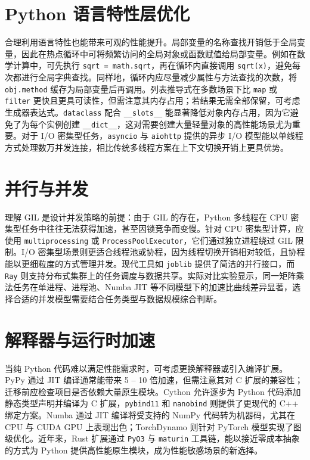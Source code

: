 \chapter{Python 语言特性层优化}
合理利用语言特性也能带来可观的性能提升。局部变量的名称查找开销低于全局变量，因此在热点循环中可将频繁访问的全局对象或函数赋值给局部变量。例如在数学计算中，可先执行 \texttt{sqrt = math.sqrt}，再在循环内直接调用 \texttt{sqrt(x)}，避免每次都进行全局字典查找。同样地，循环内应尽量减少属性与方法查找的次数，将 \texttt{obj.method} 缓存为局部变量后再调用。列表推导式在多数场景下比 \texttt{map} 或 \texttt{filter} 更快且更具可读性，但需注意其内存占用；若结果无需全部保留，可考虑生成器表达式。\texttt{dataclass} 配合 \texttt{\_{}\_{}slots\_{}\_{}} 能显著降低对象内存占用，因为它避免了为每个实例创建 \texttt{\_{}\_{}dict\_{}\_{}}，这对需要创建大量轻量对象的高性能场景尤为重要。对于 I/O 密集型任务，\texttt{asyncio} 与 \texttt{aiohttp} 提供的异步 I/O 模型能以单线程方式处理数万并发连接，相比传统多线程方案在上下文切换开销上更具优势。\par
\chapter{并行与并发}
理解 GIL 是设计并发策略的前提：由于 GIL 的存在，Python 多线程在 CPU 密集型任务中往往无法获得加速，甚至因锁竞争而变慢。针对 CPU 密集型计算，应使用 \texttt{multiprocessing} 或 \texttt{ProcessPoolExecutor}，它们通过独立进程绕过 GIL 限制。I/O 密集型场景则更适合线程池或协程，因为线程切换开销相对较低，且协程能以更细粒度的方式管理并发。现代工具如 \texttt{joblib} 提供了简洁的并行接口，而 \texttt{Ray} 则支持分布式集群上的任务调度与数据共享。实际对比实验显示，同一矩阵乘法任务在单进程、进程池、Numba JIT 等不同模型下的加速比曲线差异显著，选择合适的并发模型需要结合任务类型与数据规模综合判断。\par
\chapter{解释器与运行时加速}
当纯 Python 代码难以满足性能需求时，可考虑更换解释器或引入编译扩展。PyPy 通过 JIT 编译通常能带来 5 – 10 倍加速，但需注意其对 C 扩展的兼容性；迁移前应检查项目是否依赖大量原生模块。Cython 允许逐步为 Python 代码添加静态类型声明并编译为 C 扩展，\texttt{pybind11} 和 \texttt{nanobind} 则提供了更现代的 C++ 绑定方案。Numba 通过 JIT 编译将受支持的 NumPy 代码转为机器码，尤其在 CPU 与 CUDA GPU 上表现出色；TorchDynamo 则针对 PyTorch 模型实现了图级优化。近年来，Rust 扩展通过 \texttt{PyO3} 与 \texttt{maturin} 工具链，能以接近零成本抽象的方式为 Python 提供高性能原生模块，成为性能敏感场景的新选择。\par
